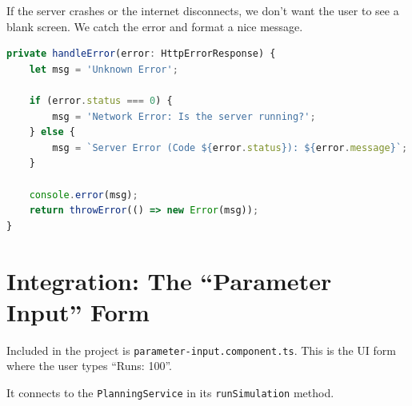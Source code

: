 \documentclass[a4paper,11pt,oneside]{report}
\begin{document}
If the server crashes or the internet disconnects, we don't want the user to see a blank screen. We catch the error and format a nice message.

\begin{lstlisting}[language=TypeScript]
private handleError(error: HttpErrorResponse) {
    let msg = 'Unknown Error';
    
    if (error.status === 0) {
        msg = 'Network Error: Is the server running?';
    } else {
        msg = `Server Error (Code ${error.status}): ${error.message}`;
    }
    
    console.error(msg);
    return throwError(() => new Error(msg));
}
\end{lstlisting}

\section{Integration: The ``Parameter Input'' Form}

Included in the project is \texttt{parameter-input.component.ts}. This is the UI form where the user types ``Runs: 100''.

It connects to the \texttt{PlanningService} in its \texttt{runSimulation} method.
\end{document}
